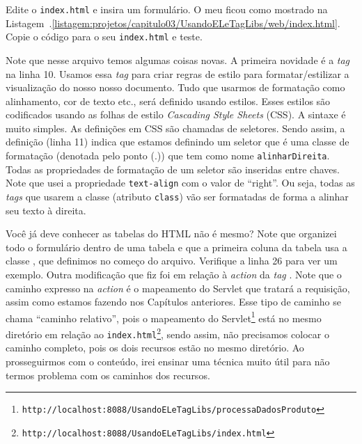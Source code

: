 Edite o \texttt{index.html} e insira um formulário. O meu ficou como mostrado na Listagem~\thechapter.\ref{listagem:projetos/capitulo03/UsandoELeTagLibs/web/index.html}. Copie o código para o seu \texttt{index.html} e teste. 


Note que nesse arquivo temos algumas coisas novas. A primeira novidade é a \textit{tag}  na linha 10. Usamos essa \textit{tag} para criar regras de estilo para formatar/estilizar a visualização do nosso nosso documento. Tudo que usarmos de formatação como alinhamento, cor de texto etc., será definido usando estilos. Esses estilos são codificados usando as folhas de estilo \textit{Cascading Style Sheets} (CSS). A sintaxe é muito simples. As definições em CSS são chamadas de seletores. Sendo assim, a definição  (linha 11) indica que estamos definindo um seletor que é uma classe de formatação (denotada pelo ponto (.)) que tem como nome \texttt{alinharDireita}. Todas as propriedades de formatação de um seletor são inseridas entre chaves. Note que usei a propriedade \texttt{text-align} com o valor de ``right''. Ou seja, todas as \textit{tags} que usarem a classe (atributo \texttt{class})  vão ser formatadas de forma a alinhar seu texto à direita.

Você já deve conhecer as tabelas do HTML não é mesmo? Note que organizei todo o formulário dentro de uma tabela e que a primeira coluna da tabela usa a classe , que definimos no começo do arquivo. Verifique a linha 26 para ver um exemplo. Outra modificação que fiz foi em relação à \textit{action} da \textit{tag} . Note que o caminho expresso na \textit{action} é o mapeamento do Servlet que tratará a requisição, assim como estamos fazendo nos Capítulos anteriores. Esse tipo de caminho se chama ``caminho relativo'', pois o mapeamento do Servlet\footnote{\texttt{http://localhost:8088/UsandoELeTagLibs/processaDadosProduto}} está no mesmo diretório em relação ao \texttt{index.html}\footnote{\texttt{http://localhost:8088/UsandoELeTagLibs/index.html}}, sendo assim, não precisamos colocar o caminho completo, pois os dois recursos estão no mesmo diretório. Ao prosseguirmos com o conteúdo, irei ensinar uma técnica muito útil para não termos problema com os caminhos dos recursos.

